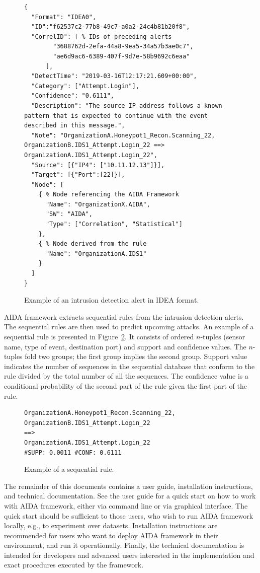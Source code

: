 \documentclass[a4paper]{article} %
\begin{document}
\begin{figure}[h]
\begin{lstlisting}[]
{
  "Format": "IDEA0",
  "ID":"f62537c2-77b8-49c7-a0a2-24c4b81b20f8",
  "CorrelID": [ % IDs of preceding alerts
        "3688762d-2efa-44a8-9ea5-34a57b3ae0c7",
        "ae6d9ac6-6389-407f-9d7e-58b9692c6eaa"
      ],
  "DetectTime": "2019-03-16T12:17:21.609+00:00",
  "Category": ["Attempt.Login"],
  "Confidence": "0.6111",
  "Description": "The source IP address follows a known pattern that is expected to continue with the event described in this message.",
  "Note": "OrganizationA.Honeypot1_Recon.Scanning_22, OrganizationB.IDS1_Attempt.Login_22 ==> OrganizationA.IDS1_Attempt.Login_22",
  "Source": [{"IP4": ["10.11.12.13"]}],
  "Target": [{"Port":[22]}],
  "Node": [
    { % Node referencing the AIDA Framework
      "Name": "OrganizationX.AIDA",
      "SW": "AIDA",
      "Type": ["Correlation", "Statistical"]
    },
    { % Node derived from the rule
      "Name": "OrganizationA.IDS1"
    }
  ]
}
\end{lstlisting}
\caption{Example of an intrusion detection alert in IDEA format.}
\label{fig:idea}
\end{figure}

AIDA framework extracts sequential rules from the intrusion detection alerts. The sequential rules are then used to predict upcoming attacks. An example of a sequential rule is presented in Figure~\ref{fig:seqrule}. It consists of ordered $n$-tuples (sensor name, type of event, destination port) and support and confidence values. The $n$-tuples fold two groups; the first group implies the second group. Support value indicates the number of sequences in the sequential database that conform to the rule divided by the total number of all the sequences. The confidence value is a conditional probability of the second part of the rule given the first part of the rule.

\begin{figure}[h]
\begin{lstlisting}[]
OrganizationA.Honeypot1_Recon.Scanning_22,
OrganizationB.IDS1_Attempt.Login_22
==>
OrganizationA.IDS1_Attempt.Login_22
#SUPP: 0.0011 #CONF: 0.6111
\end{lstlisting}
\caption{Example of a sequential rule.}
\label{fig:seqrule}
\end{figure}

The remainder of this documents contains a user guide, installation instructions, and technical documentation. See the user guide for a quick start on how to work with AIDA framework, either via command line or via graphical interface. The quick start should be sufficient to those users, who wish to run AIDA framework locally, e.g., to experiment over datasets. Installation instructions are recommended for users who want to deploy AIDA framework in their environment, and run it operationally. Finally, the technical documentation is intended for developers and advanced users interested in the implementation and exact procedures executed by the framework.
\end{document}
